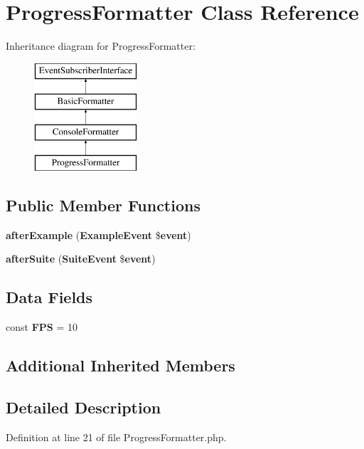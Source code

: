 \section{Progress\+Formatter Class Reference}
\label{class_php_spec_1_1_formatter_1_1_progress_formatter}
Inheritance diagram for Progress\+Formatter\+:\begin{figure}[H]
\begin{center}
\leavevmode
\includegraphics[height=4.000000cm]{class_php_spec_1_1_formatter_1_1_progress_formatter}
\end{center}
\end{figure}
\subsection*{Public Member Functions}
\begin{DoxyCompactItemize}
\item 
{\bf after\+Example} ({\bf Example\+Event} \${\bf event})
\item 
{\bf after\+Suite} ({\bf Suite\+Event} \${\bf event})
\end{DoxyCompactItemize}
\subsection*{Data Fields}
\begin{DoxyCompactItemize}
\item 
const {\bf F\+P\+S} = 10
\end{DoxyCompactItemize}
\subsection*{Additional Inherited Members}


\subsection{Detailed Description}


Definition at line 21 of file Progress\+Formatter.\+php.



